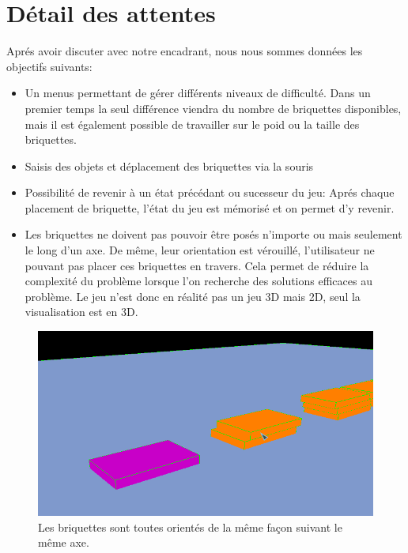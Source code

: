 \documentclass[frenchb,twoside]{EPURapport}
\begin{document}
\section{Détail des attentes}
    Aprés avoir discuter avec notre encadrant, nous nous sommes données les objectifs suivants:
    \begin{itemize}
        \item Un menus permettant de gérer différents niveaux de difficulté.
        Dans un premier temps la seul différence viendra du nombre de
        briquettes disponibles, mais il est également possible de travailler
        sur le poid ou la taille des briquettes.
        \item Saisis des objets et déplacement des briquettes via la souris
        \item Possibilité de revenir à un état précédant ou sucesseur du jeu:
        Aprés chaque placement de briquette, l'état du jeu est mémorisé et on
        permet d'y revenir.
        \item Les briquettes ne doivent pas pouvoir être posés n'importe ou
        mais seulement le long d'un axe. De même, leur orientation est
        vérouillé, l'utilisateur ne pouvant pas placer ces briquettes en
        travers. Cela permet de réduire la complexité du problème lorsque l'on
        recherche des solutions efficaces au problème.
        Le jeu n'est donc en réalité pas un jeu 3D mais 2D, seul la visualisation est en 3D.
        
    \end{itemize}
     \begin{figure}[h]
		\centering
        \includegraphics[scale=0.75]{images/zoom_briquette.png}
        \caption{\label{fig:zoom_briquette}Les briquettes sont toutes orientés de la même façon suivant le même axe.}
    \end{figure}
\end{document}
